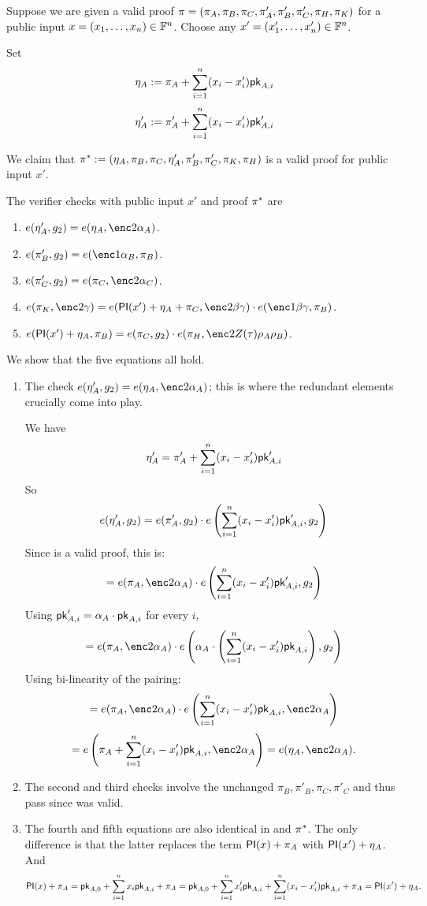 \documentclass[11pt]{article}
\numberwithin{figure}{section} %
\begin{document}
 
 Suppose we are given a valid proof $\pi = (\pi_A,\pi_B,\pi_C,\pi'_A,\pi'_B,\pi'_C,\pi_H,\pi_K)$
 for a public input $x=(x_1,\ldots,x_n)\in \mathbb F^{n}$.
 Choose any $x'=(x'_1,\ldots,x'_n)\in \mathbb F^n$.

 Set 
 \[\eta_A:= \pi_A + \sum_{i=1}^n (x_i-x'_i)\mathsf{pk}_{A,i}\]
 \[\eta'_A:= \pi'_A + \sum_{i=1}^n (x_i-x'_i) \mathsf{pk}'_{A,i}\]
 
 We claim that $\pi^* := (\eta_A,\pi_B,\pi_C,\eta'_A,\pi'_B,\pi'_C,\pi_K,\pi_H)$ is a valid proof for
 public input $x'$.
 
 The verifier checks with public input $x'$ and proof $\pi^*$ are
\begin{enumerate}
 \item $e(\eta'_A,g_2)=e(\eta_A,\enc2{\alpha_A})$.
\item $e(\pi'_B, g_2)=e(\enc1{\alpha_B},\pi_B)$.
\item $e(\pi'_C,g_2)=e(\pi_C,\enc2{\alpha_C})$.
\item $e(\pi_K,\enc2{\gamma})=e(\PI(x')+\eta_A+\pi_C,\enc2{\beta\gamma})\cdot e(\enc1{\beta\gamma},\pi_B)$.
\item $e(\PI(x')+\eta_A,\pi_B)= e(\pi_C,g_2)\cdot e(\pi_H,\enc2{Z(\tau)\rho_A\rho_B})$.
 \end{enumerate}
 
 
 We show that the five equations all hold.
 \begin{enumerate}
  \item The check  $e(\eta'_A,g_2)=e(\eta_A,\enc2{\alpha_A})$;
  this is where the redundant elements crucially come into play.
  
  
  We have
  \[\eta'_A = \pi'_A + \sum_{i=1}^n (x_i-x'_i) \mathsf{pk}'_{A,i}\]
 So
 \[e(\eta'_A,g_2) = e(\pi'_A,g_2)\cdot e\left(\sum_{i=1}^n (x_i-x'_i) \mathsf{pk}'_{A,i},g_2\right)\]
 Since \prf is a valid proof, this is:
  \[=e(\pi_A,\enc2{\alpha_A})\cdot e\left(\sum_{i=1}^n (x_i-x'_i) \pk'_{A,i},g_2\right)\]
  Using $\mathsf{pk}'_{A,i} = \alpha_A\cdot \mathsf{pk}_{A,i}$ for every $i$,
  \[=e(\pi_A,\enc2{\alpha_A})\cdot e\left(\alpha_A\cdot \left(\sum_{i=1}^n (x_i-x'_i) \pk_{A,i}\right),g_2\right)\]
Using bi-linearity of the pairing:
 \[=e(\pi_A,\enc2{\alpha_A})\cdot e\left(\sum_{i=1}^n (x_i-x'_i) \pk_{A,i},\enc2{\alpha_A}\right)\]
  \[=e\left(\pi_A+\sum_{i=1}^n (x_i-x'_i) \pk_{A,i},\enc2{\alpha_A}\right) = e(\eta_A,\enc2{\alpha_A}).\]
  \item The second and third checks involve the unchanged $\pi_B,\pi'_B,\pi_C,\pi'_C$
  and thus pass since \prf was valid.
  \item The fourth and fifth equations are also identical in \prf and $\pi^*$.
  The only difference is that the latter replaces the term $\mathsf{PI}(x) + \pi_A$ 
  with $\mathsf{PI}(x')+ \eta_A$. And 
    \[\mathsf{PI}(x) + \pi_A = \mathsf{pk}_{A,0} + \sum_{i=1}^n x_i\mathsf{pk}_{A,i} + \pi_A = 
  \mathsf{pk}_{A,0} + \sum_{i=1}^n x'_i\mathsf{pk}_{A,i} +  \sum_{i=1}^n (x_i-x'_i) \mathsf{pk}_{A,i}  + \pi_A =
  \mathsf{PI}(x') + \eta_A.
  \]

 \end{enumerate}
 
\end{document}
